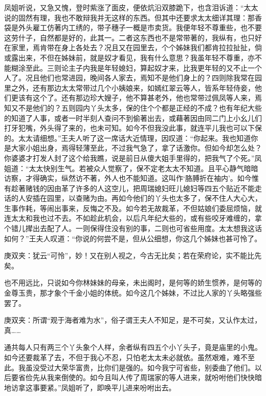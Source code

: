 \begin{parag}
    凤姐听说，又急又愧，登时紫涨了面皮，便依炕沿双膝跪下，也含泪诉道：“太太说的固然有理，我也不敢辩我并无这样的东西。但其中还要求太太细详其理：那香袋是外头雇工仿著内工绣的，带子穗子一概是市卖货。我便年轻不尊重些，也不要这劳什子，自然都是好的，此其一。二者这东西也不是常带著的，我纵有，也只好在家里，焉肯带在身上各处去？况且又在园里去，个个姊妹我们都肯拉拉扯扯，倘或露出来，不但在姊妹前，就是奴才看见，我有什么意思？我虽年轻不尊重，亦不能糊涂至此。三则论主子内我是年轻媳妇，算起奴才来，比我更年轻的又不止一个人了。况且他们也常进园，晚间各人家去，焉知不是他们身上的？四则除我常在园里之外，还有那边太太常带过几个小姨娘来，如嫣红翠云等人，皆系年轻侍妾，他们更该有这个了。还有那边珍大嫂子，他不算甚老外，他也常带过佩凤等人来，焉知又不是他们的？五则园内丫头太多，保的住个个都是正经的不成？也有年纪大些的知道了人事，或者一时半刻人查问不到偷著出去，或藉著因由同二门上小幺儿们打牙犯嘴，外头得了来的，也未可知。如今不但我没此事，就连平儿我也可以下保的。太太请细想。”王夫人听了这一席话大近情理，因叹道：“你起来。我也知道你是大家小姐出身，焉得轻薄至此，不过我气急了，拿了话激你。但如今却怎么处？你婆婆才打发人封了这个给我瞧，说是前日从傻大姐手里得的，把我气了个死。”凤姐道：“太太快别生气。若被众人觉察了，保不定老太太不知道。且平心静气暗暗访察，才得确实，纵然访不著，外人也不能知道。这叫作‘胳膊折在袖内’。如今惟有趁著赌钱的因由革了许多的人这空儿，把周瑞媳妇旺儿媳妇等四五个贴近不能走话的人安插在园里，以查赌为由。再如今他们的丫头也太多了，保不住人大心大，生事作耗，等闹出事来，反悔之不及。如今若无故裁革，不但姑娘们委屈烦恼，就连太太和我也过不去。不如趁此机会，以后凡年纪大些的，或有些咬牙难缠的，拿个错儿撵出去配了人。一则保得住没有别的事，二则也可省些用度。太太想我这话如何？”王夫人叹道：“你说的何尝不是，但从公细想，你这几个姊妹也甚可怜了。\begin{note}庚双夹：犹云“可怜”，妙！又在别人视之，今古无比矣；若在荣府论，实不能比先矣。\end{note}也不用远比，只说如今你林妹妹的母亲，未出阁时，是何等的娇生惯养，是何等的金尊玉贵，那才象个千金小姐的体统。如今这几个姊妹，不过比人家的丫头略强些罢了。\begin{note}庚双夹：所谓“观于海者难为水”，俗子谓王夫人不知足，是不可矣，又认作太过，真……\end{note}通共每人只有两三个丫头象个人样，余者纵有四五个小丫头子，竟是庙里的小鬼。如今还要裁革了去，不但于我心不忍，只怕老太太未必就依。虽然艰难，难不至此。我虽没受过大荣华富贵，比你们是强的。如今我宁可省些，别委曲了他们。以后要省俭先从我来倒使的。如今且叫人传了周瑞家的等人进来，就吩咐他们快快暗地访拿这事要紧。”凤姐听了，即唤平儿进来吩咐出去。
\end{parag}


